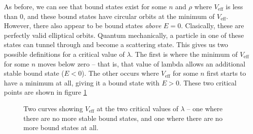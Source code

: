 \documentclass[12pt,twoside]{reedthesis}
\begin{document}
As before, we can see that bound states exist for some $n$ and $\rho$ where $V_{\mathrm{eff}}$ is less than 0, and these bound states have circular orbits at the minimum of $V_{\mathrm{eff}}$. However, there also appear to be bound states \emph{above} $E = 0$. Clasically, these are perfectly valid elliptical orbits. Quantum mechanically, a particle in one of these states can tunnel through and become a scattering state. This gives us two possible definitions for a critical value of $\lambda$.  The first is where the minimum of $V_{\mathrm{eff}}$ for some $n$ moves below zero -- that is, that value of lambda allows an additional stable bound state ($E < 0$). The other occurs where $V_{\mathrm{eff}}$ for some $n$ first starts to have a minimum at all, giving it a bound state with $E>0$. These two critical points are shown in figure \ref{fig:critpoints}

\begin{figure}[h]
\caption[The two critical values of $\lambda$]{Two curves showing $V_{\mathrm{eff}}$ at the two critical values of $\lambda$ -- one where there are no more stable bound states, and one where there are no more bound states at all.}
\label{fig:critpoints}
\end{figure}
\end{document}
